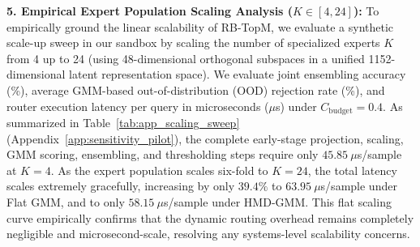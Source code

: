 \textbf{5. Empirical Expert Population Scaling Analysis ($K \in [4, 24]$):} To empirically ground the linear scalability of RB-TopM, we evaluate a synthetic scale-up sweep in our sandbox by scaling the number of specialized experts $K$ from 4 up to 24 (using 48-dimensional orthogonal subspaces in a unified 1152-dimensional latent representation space). We evaluate joint ensembling accuracy (\%), average GMM-based out-of-distribution (OOD) rejection rate (\%), and router execution latency per query in microseconds ($\mu$s) under $C_{\text{budget}} = 0.4$. As summarized in Table~\ref{tab:app_scaling_sweep} (Appendix~\ref{app:sensitivity_pilot}), the complete early-stage projection, scaling, GMM scoring, ensembling, and thresholding steps require only $45.85\ \mu$s/sample at $K=4$. As the expert population scales six-fold to $K=24$, the total latency scales extremely gracefully, increasing by only $39.4\%$ to $63.95\ \mu$s/sample under Flat GMM, and to only $58.15\ \mu$s/sample under HMD-GMM. This flat scaling curve empirically confirms that the dynamic routing overhead remains completely negligible and microsecond-scale, resolving any systems-level scalability concerns.

